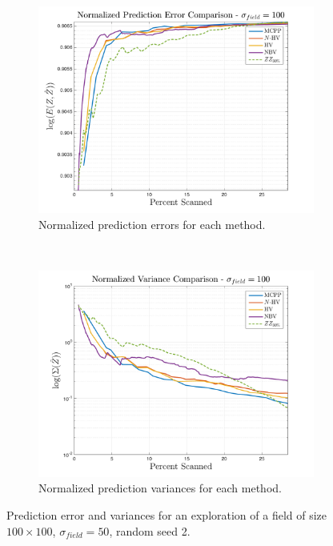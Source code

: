 \begin{figure}[htb!]
    \centering
    \begin{subfigure}[t]{0.75\textwidth}
        \centering
        \includegraphics[width=\linewidth]{figures/normalized_errors_30p_100x100_sf_100_seed_2_app_10.png}
        \captionsetup{skip=0.20\baselineskip,size=footnotesize}
        \caption{Normalized prediction errors for each method.}
    \end{subfigure}%
    \\
    \begin{subfigure}[t]{0.75\textwidth}
        \centering
        \includegraphics[width=\linewidth]{figures/normalized_variances_30p_100x100_sf_100_seed_2_app_10.png}
        \captionsetup{skip=0.20\baselineskip,size=footnotesize}
        \caption{Normalized prediction variances for each method.}
    \end{subfigure}%
    \captionsetup{skip=0.20\baselineskip}
    \caption{Prediction error and variances for an exploration of a field of size $100 \times 100$, $\sigma_{field} = 50$, random seed 2.}
    \label{fig:errvar50}
\end{figure}

